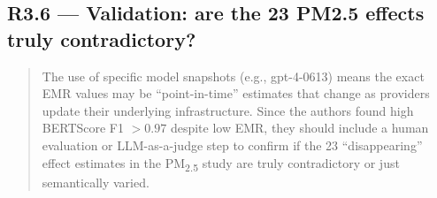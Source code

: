 \documentclass[11pt,a4paper]{article}
\newenvironment{revquote}{%
  \begin{quote}\small\itshape\color{revgray}
}{%
  \end{quote}
}
\begin{document}
\begin{table}[H]
\centering
\caption*{\small\textbf{Methods Table~3 (manuscript). Mapping of non-determinism mechanisms to deployment stacks.} \checkmark, present and verifiable; ``likely'', consistent with public documentation and standard production practice; ``possible'', plausible but not confirmed; ---, absent or strongly mitigated; $\triangle$, present in principle but mitigated by design (single-GPU integer arithmetic). For closed-source stacks, attribution is necessarily inferential.}
\small
{}
\end{table}

\subsection*{R3.6 --- Validation: are the 23 PM2.5 effects truly contradictory?}

\begin{revquote}
The use of specific model snapshots (e.g., gpt-4-0613) means the exact EMR values may be ``point-in-time'' estimates that change as providers update their underlying infrastructure. Since the authors found high BERTScore F1 $>0.97$ despite low EMR, they should include a human evaluation or LLM-as-a-judge step to confirm if the 23 ``disappearing'' effect estimates in the PM\textsubscript{2.5} study are truly contradictory or just semantically varied.
\end{revquote}
\end{document}
